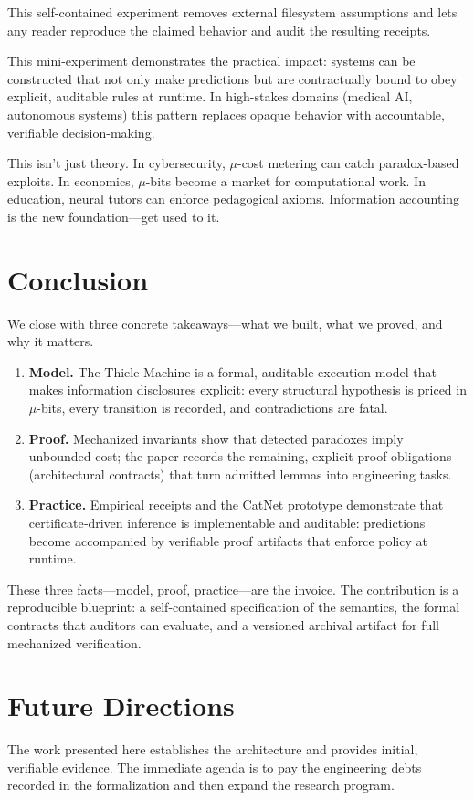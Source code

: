 \documentclass[11pt]{article}
\begin{document}
This self-contained experiment removes external filesystem assumptions and lets any reader reproduce the claimed behavior and audit the resulting receipts.

This mini-experiment demonstrates the practical impact: systems can be constructed that not only make predictions but are contractually bound to obey explicit, auditable rules at runtime. In high-stakes domains (medical AI, autonomous systems) this pattern replaces opaque behavior with accountable, verifiable decision-making.

This isn’t just theory. In cybersecurity, $\mu$-cost metering can catch paradox-based exploits. In economics, $\mu$-bits become a market for computational work. In education, neural tutors can enforce pedagogical axioms. Information accounting is the new foundation---get used to it.

\section{Conclusion}
We close with three concrete takeaways—what we built, what we proved, and why it matters.

\begin{enumerate}
  \item \textbf{Model.} The Thiele Machine is a formal, auditable execution model that makes information disclosures explicit: every structural hypothesis is priced in \(\mu\)-bits, every transition is recorded, and contradictions are fatal.
  \item \textbf{Proof.} Mechanized invariants show that detected paradoxes imply unbounded cost; the paper records the remaining, explicit proof obligations (architectural contracts) that turn admitted lemmas into engineering tasks.
  \item \textbf{Practice.} Empirical receipts and the CatNet prototype demonstrate that certificate‑driven inference is implementable and auditable: predictions become accompanied by verifiable proof artifacts that enforce policy at runtime.
\end{enumerate}

These three facts—model, proof, practice—are the invoice. The contribution is a reproducible blueprint: a self-contained specification of the semantics, the formal contracts that auditors can evaluate, and a versioned archival artifact for full mechanized verification.

\section{Future Directions}
The work presented here establishes the architecture and provides initial, verifiable evidence. The immediate agenda is to pay the engineering debts recorded in the formalization and then expand the research program.
\end{document}
